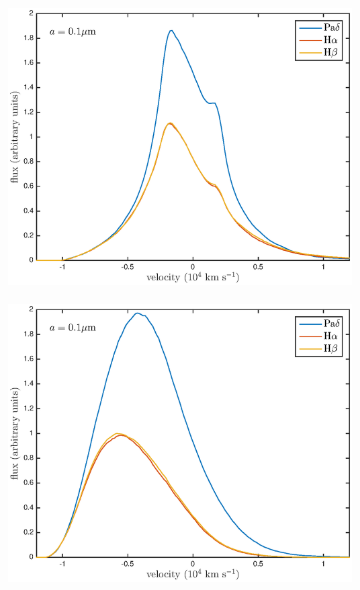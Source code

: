 \begin{figure}
\begin{subfigure}{0.5\textwidth}

\includegraphics[trim =30 31 45 0,clip=true,scale=0.45]{chapters/chapter4/images/dustdep/a0_1_opt_thin_HaHbPad}
\end{subfigure}
\hspace{4mm}
\begin{subfigure}{0.5\textwidth}
\includegraphics[trim =59 31 45 0,clip=true,scale=0.45]{chapters/chapter4/images/dustdep/a0_1_opt_thick_HaHbPad}
\end{subfigure} \\[1ex]


\end{figure}

